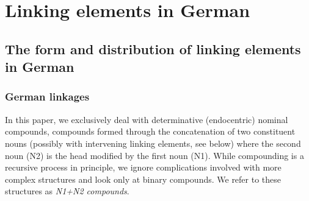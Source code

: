 \section{Linking elements in German}
\label{sec:linkingelementsingerman}

\subsection{The form and distribution of linking elements in German}
\label{sec:theformanddistributionoflinkingelementsingerman}

\subsubsection{German linkages}

In this paper, we exclusively deal with determinative (endocentric) nominal compounds, \ie compounds formed through the concatenation of two constituent nouns (possibly with intervening linking elements, see below) where the second noun (N2) is the head modified by the first noun (N1).
While compounding is a recursive process in principle, we ignore complications involved with more complex structures and look only at binary compounds.
We refer to these structures as \textit{N1+N2 compounds}.


